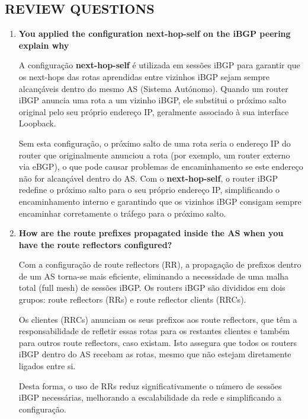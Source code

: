 \documentclass[11pt,english, openright, oneside]{book}
\begin{document}
\pagebreak
\subsection{REVIEW QUESTIONS}
\vspace{0.2cm}

\begin{enumerate}
  \item \textbf{You applied the configuration next-hop-self on the iBGP peering explain why} 
  \vspace{0.2cm}

  A configuração \textbf{next-hop-self} é utilizada em sessões iBGP para garantir que os next-hops das rotas aprendidas entre vizinhos iBGP sejam sempre alcançáveis dentro do mesmo AS (Sistema Autónomo). Quando um router iBGP anuncia uma rota a um vizinho iBGP, ele substitui o próximo salto original pelo seu próprio endereço IP, geralmente associado à sua interface Loopback.

  Sem esta configuração, o próximo salto de uma rota seria o endereço IP do router que originalmente anunciou a rota (por exemplo, um router externo via eBGP), o que pode causar problemas de encaminhamento se este endereço não for alcançável dentro do AS. Com o \textbf{next-hop-self}, o router iBGP redefine o próximo salto para o seu próprio endereço IP, simplificando o encaminhamento interno e garantindo que os vizinhos iBGP consigam sempre encaminhar corretamente o tráfego para o próximo salto.
  \vspace{0.2cm}

  \item \textbf{How are the route prefixes propagated inside the AS when you have the route reflectors configured?} 
  \vspace{0.2cm}

  Com a configuração de route reflectors (RR), a propagação de prefixos dentro de um AS torna-se mais eficiente, eliminando a necessidade de uma malha total (full mesh) de sessões iBGP. Os routers iBGP são divididos em dois grupos: route reflectors (RRs) e route reflector clients (RRCs).

  Os clientes (RRCs) anunciam os seus prefixos aos route reflectors, que têm a responsabilidade de refletir essas rotas para os restantes clientes e também para outros route reflectors, caso existam. Isto assegura que todos os routers iBGP dentro do AS recebam as rotas, mesmo que não estejam diretamente ligados entre si.
  
  Desta forma, o uso de RRs reduz significativamente o número de sessões iBGP necessárias, melhorando a escalabilidade da rede e simplificando a configuração.
  \vspace{0.2cm}


\end{enumerate}
\end{document}
